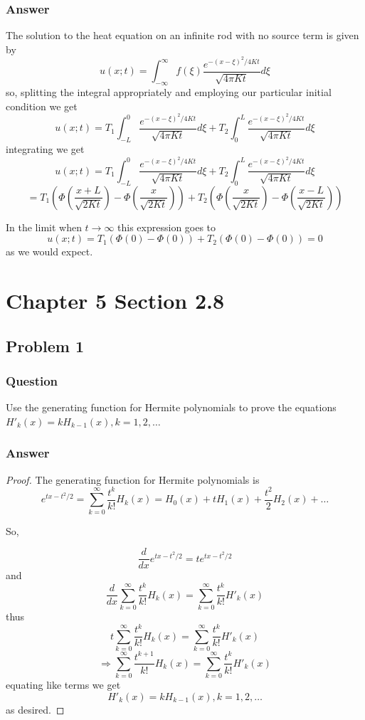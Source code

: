 \documentclass[12pt]{article}
\begin{document}
\subsubsection{Answer}

The solution to the heat equation on an infinite rod with no source term is given \cite[Page 297]{pinsky} by
\[u(x;t)=\int_{-\infty}^\infty f(\xi) \frac{e^{-(x-\xi)^2/4 K t}}{\sqrt{4 \pi K t}} d\xi\]
so, splitting the integral appropriately and employing our particular initial condition we get 
\[u(x;t)=T_1 \int_{-L}^0  \frac{e^{-(x-\xi)^2/4 K t}}{\sqrt{4 \pi K t}} d\xi+T_2 \int_{0}^L \frac{e^{-(x-\xi)^2/4 K t}}{\sqrt{4 \pi K t}} d\xi \]
integrating we get
\[u(x;t)=T_1 \int_{-L}^0  \frac{e^{-(x-\xi)^2/4 K t}}{\sqrt{4 \pi K t}} d\xi+T_2 \int_{0}^L \frac{e^{-(x-\xi)^2/4 K t}}{\sqrt{4 \pi K t}} d\xi \]
\[=T_1 \left( \Phi \left( \frac{x+L}{\sqrt{2 K t}} \right) - \Phi \left( \frac{x}{\sqrt{2 K t}} \right) \right) + T_2 \left( \Phi \left( \frac{x}{\sqrt{2 K t}} \right) - \Phi \left( \frac{x-L}{\sqrt{2 K t}} \right) \right)\]

In the limit when $t \to \infty$ this expression goes to
\[u(x;t)=T_1 \left( \Phi \left( 0 \right) - \Phi \left( 0 \right) \right) + T_2 \left( \Phi \left( 0 \right) - \Phi \left( 0 \right) \right) = 0\]
as we would expect.


\section{Chapter 5 Section 2.8}

\subsection{Problem 1}
\subsubsection{Question}

Use the generating function for Hermite polynomials to prove the equations $H'_k(x)=kH_{k-1}(x), k=1,2,\dots$

\subsubsection{Answer}

\begin{proof}The generating function for Hermite polynomials is 
\[e^{t x -t^2/2}= \sum_{k=0}^\infty \frac{t^k}{k!} H_k(x)=H_0(x)+t H_1(x) +
\frac{t^2}{2} H_2(x) + \dots \] 

So, 


\[\frac{d}{dx}  e^{tx-t^2/2}= t e^{tx-t^2/2} \]
and
\[\frac{d}{dx} \sum_{k=0}^\infty \frac{t^k}{k!} H_k(x) =\sum_{k=0}^\infty \frac{t^k}{k!} H'_k(x) \]
thus
\[t\sum_{k=0}^\infty \frac{t^k}{k!} H_k(x) =\sum_{k=0}^\infty \frac{t^k}{k!} H'_k(x) \]
\[\Rightarrow \sum_{k=0}^\infty \frac{t^{k+1}}{k!} H_k(x) =\sum_{k=0}^\infty \frac{t^k}{k!} H'_k(x) \]
equating like terms we get
\[H'_k(x)=kH_{k-1}(x), k=1,2,\dots\]
as desired.
\end{proof}
\end{document}
